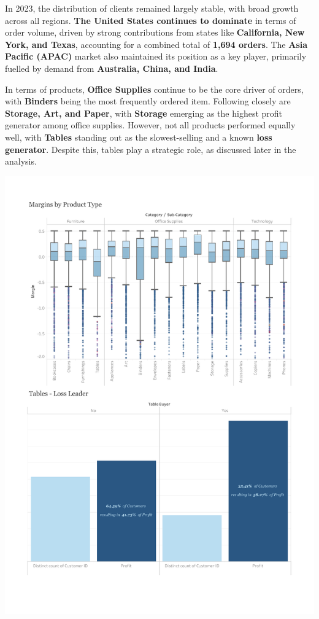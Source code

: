 \documentclass[12pt,a4paper]{article}
\begin{document}
In 2023, the distribution of clients remained largely stable, with broad growth across all regions. \textbf{The United States continues to dominate} in terms of order volume, driven by strong contributions from states like \textbf{California, New York, and Texas}, accounting for a combined total of \textbf{1,694 orders}. The \textbf{Asia Pacific (APAC)} market also maintained its position as a key player, primarily fuelled by demand from \textbf{Australia, China, and India}.

In terms of products, \textbf{Office Supplies} continue to be the core driver of orders, with \textbf{Binders} being the most frequently ordered item. Following closely are \textbf{Storage, Art, and Paper}, with \textbf{Storage} emerging as the highest profit generator among office supplies. However, not all products performed equally well, with \textbf{Tables} standing out as the slowest-selling and a known \textbf{loss generator}. Despite this, tables play a strategic role, as discussed later in the analysis.

\vspace*{-0.5cm} %

\noindent
\includegraphics[width=\paperwidth,height=\paperheight,keepaspectratio]{Dashboard2.pdf}
\end{document}
